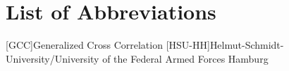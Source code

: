 \chapter*{List of Abbreviations}
\label{sec:abbreviations}

\begin{acronym}[HSU-HH]
  [GCC]{Generalized Cross Correlation}
  [HSU-HH]{Helmut-Schmidt-University/University of the Federal Armed Forces Hamburg}
\end{acronym}
